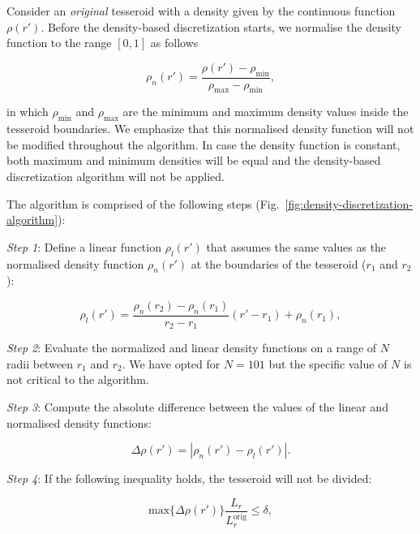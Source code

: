 \documentclass[extra, referee]{gji}
\begin{document}
Consider an \emph{original} tesseroid with a density given by the continuous function
$\rho(r')$.
Before the density-based discretization starts,
we normalise the density function to the range $[0, 1]$ as follows

\begin{equation}
    \rho_n(r') =
    \frac{\rho(r') - \rho_\text{min}}{\rho_\text{max} - \rho_\text{min}},
\end{equation}

\noindent in which $\rho_\text{min}$ and $\rho_\text{max}$ are the minimum and maximum
density values inside the tesseroid boundaries.
We emphasize that this normalised density function will not be modified throughout the
algorithm.
In case the density function is constant, both maximum and minimum densities will be
equal and the density-based discretization algorithm will not be applied.

The algorithm is comprised of the following steps
(Fig.~\ref{fig:density-discretization-algorithm}):

\textit{Step 1}:
Define a linear function $\rho_l(r')$ that assumes the same values as the normalised
density function $\rho_n(r')$ at the boundaries of the tesseroid ($r_1$ and $r_2$):

\begin{equation}
    \rho_l(r') =
    \frac{ \rho_n(r_2) - \rho_n(r_1) }{ r_2 - r_1 } (r' - r_1) + \rho_n(r_1),
    \label{eq:density-reference-line}
\end{equation}

\textit{Step 2}:
Evaluate the normalized and linear density functions on a range of $N$ radii between
$r_1$ and $r_2$.
We have opted for $N = 101$ but the specific value of $N$ is not critical to the
algorithm.

\textit{Step 3}:
Compute the absolute difference between the values of the linear and normalised density
functions:

\begin{equation}
    \Delta \rho (r') = | \rho_n(r') - \rho_l(r') |.
    \label{eq:density-abs-diff}
\end{equation}

\textit{Step 4}:
If the following inequality holds, the tesseroid will not be divided:

\begin{equation}
    \text{max}\{ \Delta \rho(r') \} \frac{L_r}{L_r^\text{orig}} \le \delta,
    \label{eq:delta-density}
\end{equation}
\end{document}
